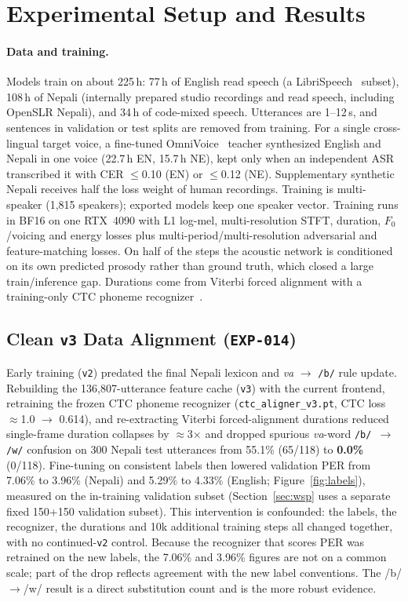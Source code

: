 \section{Experimental Setup and Results}
\label{sec:exp}

\paragraph{Data and training.}
Models train on about 225\,h: 77\,h of English read speech (a LibriSpeech~\cite{panayotov2015librispeech} subset), 108\,h of Nepali (internally prepared studio recordings and read speech, including OpenSLR Nepali), and 34\,h of code-mixed speech. Utterances are 1--12\,s, and sentences in validation or test splits are removed from training. For a single cross-lingual target voice, a fine-tuned OmniVoice~\cite{omnivoice2026} teacher synthesized English and Nepali in one voice (22.7\,h EN, 15.7\,h NE), kept only when an independent ASR transcribed it with CER $\le$0.10 (EN) or $\le$0.12 (NE). Supplementary synthetic Nepali receives half the loss weight of human recordings. Training is multi-speaker (1,815 speakers); exported models keep one speaker vector. Training runs in BF16 on one RTX~4090 with L1 log-mel, multi-resolution STFT, duration, $F_0$/voicing and energy losses plus multi-period/multi-resolution adversarial and feature-matching losses. On half of the steps the acoustic network is conditioned on its own predicted prosody rather than ground truth, which closed a large train/inference gap. Durations come from Viterbi forced alignment with a training-only CTC phoneme recognizer~\cite{graves2006ctc}.

\subsection{Clean \texttt{v3} Data Alignment (\texttt{EXP-014})}
Early training (\texttt{v2}) predated the final Nepali lexicon and \textit{va} $\rightarrow$ \texttt{/b/} rule update. Rebuilding the 136,807-utterance feature cache (\texttt{v3}) with the current frontend, retraining the frozen CTC phoneme recognizer (\texttt{ctc\_aligner\_v3.pt}, CTC loss $\approx$1.0 $\rightarrow$ 0.614), and re-extracting Viterbi forced-alignment durations reduced single-frame duration collapses by $\approx$3$\times$ and dropped spurious \textit{va}-word \texttt{/b/ $\rightarrow$ /w/} confusion on 300 Nepali test utterances from 55.1\% (65/118) to \textbf{0.0\%} (0/118). Fine-tuning on consistent labels then lowered validation PER from 7.06\% to 3.96\% (Nepali) and 5.29\% to 4.33\% (English; Figure~\ref{fig:labels}), measured on the in-training validation subset (Section~\ref{sec:wsp} uses a separate fixed 150+150 validation subset). This intervention is confounded: the labels, the recognizer, the durations and 10k additional training steps all changed together, with no continued-\texttt{v2} control. Because the recognizer that scores PER was retrained on the new labels, the 7.06\% and 3.96\% figures are not on a common scale; part of the drop reflects agreement with the new label conventions. The /b/$\to$/w/ result is a direct substitution count and is the more robust evidence.

